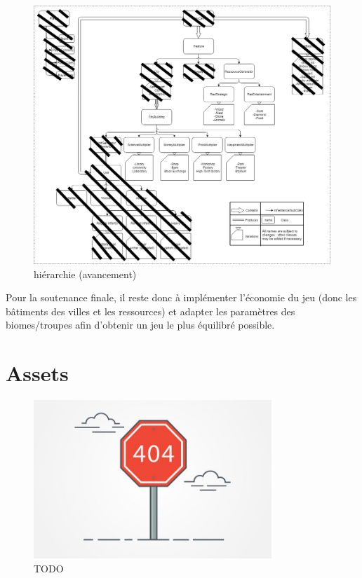 \documentclass[12pt]{report}
\begin{document}
\begin{figure}[H]
    \centering
    \includegraphics[width=1\textwidth]{class_hierarchy}
    \caption{hiérarchie (avancement)}
\end{figure}

Pour la soutenance finale, il reste donc à implémenter l’économie du jeu (donc les bâtiments des villes et les ressources) et adapter les paramètres des biomes/troupes afin d’obtenir un jeu le plus équilibré possible.

\section*{Assets}

\begin{figure}[H]
    \centering
    \includegraphics[width=0.8\textwidth]{404}
    \caption{TODO}
\end{figure}
\end{document}
